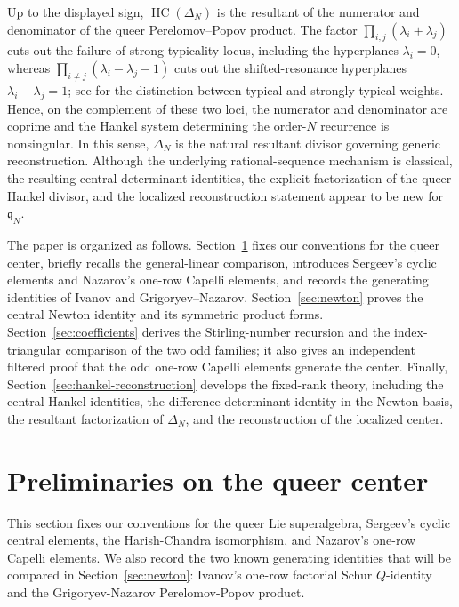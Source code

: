 \documentclass[11pt]{amsart}
\numberwithin{equation}{section}
\theoremstyle{definition}
\theoremstyle{remark}
\newcommand{\q}{\mathfrak q}
\newcommand{\HC}{\operatorname{HC}}
\begin{document}
Up to the displayed sign, \(\HC(\Delta_N)\) is the resultant of the
numerator and denominator of the queer Perelomov--Popov product.  The
factor
\(\prod_{i,j}(\lambda_i+\lambda_j)\) cuts out the
failure-of-strong-typicality locus, including the hyperplanes
\(\lambda_i=0\), whereas
\(\prod_{i\ne j}(\lambda_i-\lambda_j-1)\) cuts out the shifted-resonance
hyperplanes \(\lambda_i-\lambda_j=1\); see
\cite[Section~2]{FriskMazorchuk2009} for the distinction between
typical and strongly typical weights.  Hence, on the complement of
these two loci, the numerator and denominator are coprime and the
Hankel system determining the order-\(N\) recurrence is nonsingular.
In this sense, \(\Delta_N\) is the natural resultant divisor governing
generic reconstruction.  Although the underlying rational-sequence
mechanism is classical, the resulting central determinant identities,
the explicit factorization of the queer Hankel divisor, and the
localized reconstruction statement appear to be new for \(\q_N\).

The paper is organized as follows.
Section~\ref{sec:preliminaries} fixes our conventions for the queer
center, briefly recalls the general-linear comparison, introduces
Sergeev's cyclic elements and Nazarov's one-row Capelli elements, and
records the generating identities of Ivanov and
Grigoryev--Nazarov.  Section~\ref{sec:newton} proves the central Newton
identity and its symmetric product forms.
Section~\ref{sec:coefficients} derives the Stirling-number recursion
and the index-triangular comparison of the two odd families; it also
gives an independent filtered proof that the odd one-row Capelli
elements generate the center.  Finally,
Section~\ref{sec:hankel-reconstruction} develops the fixed-rank theory,
including the central Hankel identities, the difference-determinant
identity in the Newton basis, the resultant factorization of
\(\Delta_N\), and the reconstruction of the localized center.


\section{Preliminaries on the queer center}
\label{sec:preliminaries}

This section fixes our conventions for the queer Lie superalgebra,
Sergeev's cyclic central elements, the Harish-Chandra isomorphism, and
Nazarov's one-row Capelli elements.  We also record the two known
generating identities that will be compared in
Section~\ref{sec:newton}: Ivanov's one-row factorial Schur
\(Q\)-identity and the Grigoryev-Nazarov Perelomov-Popov product.
\end{document}
